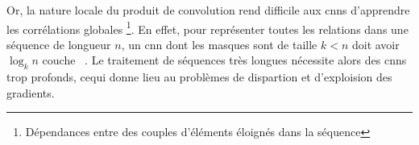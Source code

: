 Or, la nature locale du produit de convolution
rend difficile aux \glspl{cnn} d'apprendre les corrélations globales%
\footnote{Dépendances entre des couples d'éléments éloignés dans la séquence}.
En effet, pour représenter toutes les relations dans une séquence de longueur \(n\),
un \gls{cnn} dont les masques sont de taille \(k < n\) doit avoir \(\log_k n\) couche%
~\cite{attention}.
Le traitement de séquences très longues nécessite alors des \glspl{cnn} trop profonds,
cequi donne lieu au problèmes de dispartion et d'exploision des gradients.